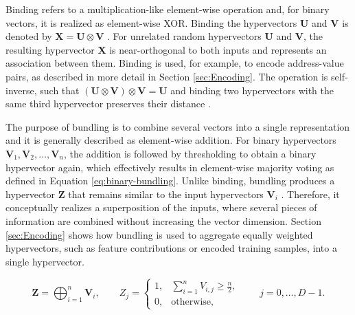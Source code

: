     Binding refers to a multiplication-like element-wise operation and, for binary vectors, it is realized as element-wise XOR. Binding the hypervectors $\mathbf{U}$ and $\mathbf{V}$ is denoted by $\mathbf{X} = \mathbf{U} \otimes \mathbf{V}$ \cite{ge_classification_2020}. For unrelated random hypervectors $\mathbf{U}$ and $\mathbf{V}$, the resulting hypervector $\mathbf{X}$ is near-orthogonal to both inputs and represents an association between them. Binding is used, for example, to encode address-value pairs, as described in more detail in Section \ref{sec:Encoding}. The operation is self-inverse, such that $(\mathbf{U} \otimes \mathbf{V}) \otimes \mathbf{V} = \mathbf{U}$ and binding two hypervectors with the same third hypervector preserves their distance \cite{kanerva_hyperdimensional_2009}.

    The purpose of bundling is to combine several vectors into a single representation and it is generally described as element-wise addition. For binary hypervectors $\mathbf{V}_1, \mathbf{V}_2, \ldots, \mathbf{V}_n$, the addition is followed by thresholding to obtain a binary hypervector again, which effectively results in element-wise majority voting as defined in Equation \ref{eq:binary-bundling}. Unlike binding, bundling produces a hypervector $\mathbf{Z}$ that remains similar to the input hypervectors $\mathbf{V}_i$ \cite{kanerva_hyperdimensional_2009}. Therefore, it conceptually realizes a superposition of the inputs, where several pieces of information are combined without increasing the vector dimension. Section \ref{sec:Encoding} shows how bundling is used to aggregate equally weighted hypervectors, such as feature contributions or encoded training samples, into a single hypervector. 

        \begin{equation}
            \mathbf{Z}
            =
            \bigoplus_{i=1}^{n} \mathbf{V}_i,
            \qquad
            Z_j =
            \begin{cases}
                1, & \displaystyle \sum_{i=1}^{n} V_{i,j} \geq \frac{n}{2},\\
                0, & \text{otherwise},
            \end{cases}
            \qquad
            j = 0,\ldots,D-1.
            \label{eq:binary-bundling}
        \end{equation}

